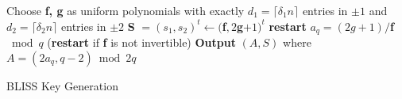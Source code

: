 \begin{algorithm}[H]
\begin{algorithmic}[1]
\State Choose \textbf{f, g} as uniform polynomials with exactly $d_1 = \lceil{\delta_1 n}\rceil$ entries in ${\pm1}$ and $d_2 = \lceil{\delta_2 n}\rceil$ entries in ${\pm2}$
\State \textbf{S} $= (s_1,s_2)^t \leftarrow ($\textbf{f}$, 2$\textbf{g}$+1)^t$
  \State \textbf{restart}
\EndIf
\State $a_q = (2g+1)/$\textbf{f}$ \bmod{q}$ (\textbf{restart} if \textbf{f} is not invertible)
\State \textbf{Output} $(A,S)$ where $A = (2 a_q, q-2) \bmod{2q}$
\EndFunction
\end{algorithmic}
\caption{BLISS Key Generation}
\end{algorithm}


